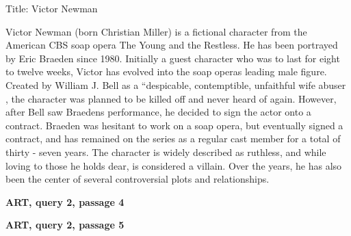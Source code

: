 {\small\ttfamily\raggedright
Title: Victor Newman\par
Victor Newman (born Christian Miller) is a fictional character from the American CBS soap opera The Young and the Restless. He has been portrayed by Eric Braeden since 1980. Initially a guest character who was to last for eight to twelve weeks, Victor has evolved into the soap opera\textquotesingle{}s leading male figure. Created by William J. Bell as a ``despicable, contemptible, unfaithful wife abuser \textquotesingle{}\textquotesingle{}, the character was planned to be killed off and never heard of again. However, after Bell saw Braeden\textquotesingle{}s performance, he decided to sign the actor onto a contract. Braeden was hesitant to work on a soap opera, but eventually signed a contract, and has remained on the series as a regular cast member for a total of thirty - seven years. The character is widely described as ruthless, and while loving to those he holds dear, is considered a villain. Over the years, he has also been the center of several controversial plots and relationships.\par
}
\smallskip
\textbf{ART, query 2, passage 4}\par{}
\smallskip
\textbf{ART, query 2, passage 5}\par{}
\smallskip
